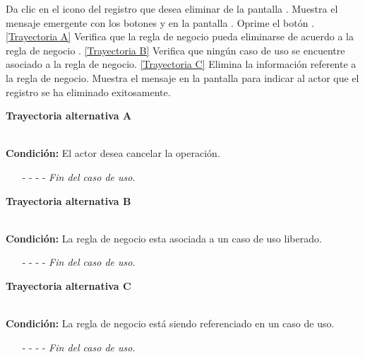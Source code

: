 	\begin{UCtrayectoria}
		\UCpaso[\UCactor] Da clic en el icono \eliminar del registro que desea eliminar de la pantalla .
		\UCpaso[\UCsist] Muestra el mensaje emergente  con los botones  y  en la pantalla .
		\UCpaso[\UCactor] Oprime el botón . \hyperlink{CU8-3:TAA}{[Trayectoria A]}
		\UCpaso[\UCsist] Verifica que la regla de negocio pueda eliminarse de acuerdo a la regla de negocio . \hyperlink{CU8-3:TAB}{[Trayectoria B]}
		\UCpaso[\UCsist] Verifica que ningún caso de uso se encuentre asociado a la regla de negocio. \hyperlink{CU8-3:TAC}{[Trayectoria C]}
		\UCpaso[\UCsist] Elimina la información referente a la regla de negocio.
		\UCpaso[\UCsist] Muestra el mensaje  en la pantalla  para indicar al actor que el registro se ha eliminado exitosamente.
	\end{UCtrayectoria}	

\hypertarget{CU8-3:TAA}{\textbf{Trayectoria alternativa A}}\\
\noindent \textbf{Condición:} El actor desea cancelar la operación.
\begin{enumerate}
	\UCpaso[\UCactor] Solicita cancelar la operación oprimiendo el botón  del mensaje emergente .
	\UCpaso[\UCsist] Muestra la pantalla .
	\item[- -] - - {\em {Fin del caso de uso}}.%
\end{enumerate}	
\hypertarget{CU8-3:TAB}{\textbf{Trayectoria alternativa B}}\\
\noindent \textbf{Condición:} La regla de negocio esta asociada a un caso de uso liberado.
\begin{enumerate}
\UCpaso[\UCsist] Oculta el botón \eliminar de la regla de negocio que esta asociada a casos de uso liberados de la pantalla .
	\item[- -] - - {\em {Fin del caso de uso}}.%
\end{enumerate}
\hypertarget{CU8-3:TAC}{\textbf{Trayectoria alternativa C}}\\
\noindent \textbf{Condición:} La regla de negocio está siendo referenciado en un caso de uso.
\begin{enumerate}
	\UCpaso[\UCsist] Muestra el mensaje  en la pantalla .
	\item[- -] - - {\em {Fin del caso de uso}}.%
\end{enumerate}
	

